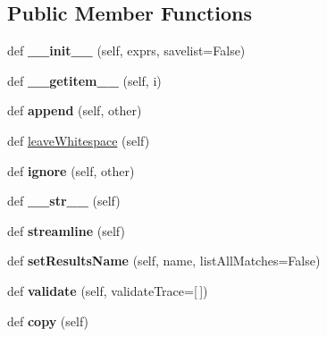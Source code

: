 \subsection*{Public Member Functions}
\begin{DoxyCompactItemize}
\item 
\mbox{\label{classsetuptools_1_1__vendor_1_1pyparsing_1_1_parse_expression_a7cd8a69a2468f1ecdc5c1a8f89e22e91}} 
def {\bfseries \+\_\+\+\_\+init\+\_\+\+\_\+} (self, exprs, savelist=False)
\item 
\mbox{\label{classsetuptools_1_1__vendor_1_1pyparsing_1_1_parse_expression_a5079e3a5cb2780458d5a0c593c55aef3}} 
def {\bfseries \+\_\+\+\_\+getitem\+\_\+\+\_\+} (self, i)
\item 
\mbox{\label{classsetuptools_1_1__vendor_1_1pyparsing_1_1_parse_expression_a00a06dce2e6acc41e3e59888494daaa5}} 
def {\bfseries append} (self, other)
\item 
def \hyperlink{classsetuptools_1_1__vendor_1_1pyparsing_1_1_parse_expression_a69c2da4772c362e6312fda61129a50a5}{leave\+Whitespace} (self)
\item 
\mbox{\label{classsetuptools_1_1__vendor_1_1pyparsing_1_1_parse_expression_a48b65baaac85f3c2cb4c6e9335a6c8e8}} 
def {\bfseries ignore} (self, other)
\item 
\mbox{\label{classsetuptools_1_1__vendor_1_1pyparsing_1_1_parse_expression_a2ebf0733124a2f792c5affb74c3133bc}} 
def {\bfseries \+\_\+\+\_\+str\+\_\+\+\_\+} (self)
\item 
\mbox{\label{classsetuptools_1_1__vendor_1_1pyparsing_1_1_parse_expression_a268ecaecb08a2528c6bcb976e4ea7070}} 
def {\bfseries streamline} (self)
\item 
\mbox{\label{classsetuptools_1_1__vendor_1_1pyparsing_1_1_parse_expression_a86baf0e35c0e87af7a2f41f7c14ecb25}} 
def {\bfseries set\+Results\+Name} (self, name, list\+All\+Matches=False)
\item 
\mbox{\label{classsetuptools_1_1__vendor_1_1pyparsing_1_1_parse_expression_afd00af0802389bfdf4ece57c5b934ede}} 
def {\bfseries validate} (self, validate\+Trace=\mbox{[}$\,$\mbox{]})
\item 
\mbox{\label{classsetuptools_1_1__vendor_1_1pyparsing_1_1_parse_expression_a89003b24141914059976d66bd492f161}} 
def {\bfseries copy} (self)
\end{DoxyCompactItemize}
